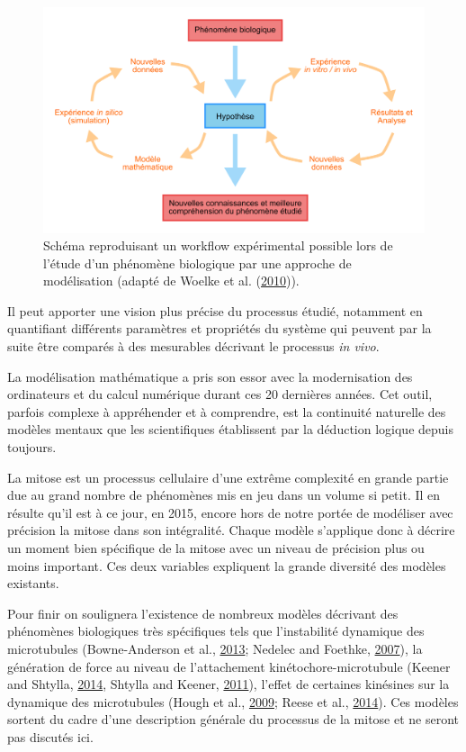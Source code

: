 \documentclass[12pt,a4paper,twoside,openright]{book}
\begin{document}
\begin{figure}[htbp]
\centering
\includegraphics{figures/intro/modelling.png}
\caption[Workflow de l'approche modélisation en biologie]{\label{fig:modelling}Schéma
reproduisant un workflow expérimental possible lors de l'étude d'un
phénomène biologique par une approche de modélisation (adapté de Woelke
et al. (\protect\hyperlink{ref-Woelke2010}{2010})).}
\end{figure}

Il peut apporter une vision plus précise du processus étudié, notamment
en quantifiant différents paramètres et propriétés du système qui
peuvent par la suite être comparés à des mesurables décrivant le
processus \emph{in vivo}.

La modélisation mathématique a pris son essor avec la modernisation des
ordinateurs et du calcul numérique durant ces 20 dernières années. Cet
outil, parfois complexe à appréhender et à comprendre, est la continuité
naturelle des modèles mentaux que les scientifiques établissent par la
déduction logique depuis toujours.

La mitose est un processus cellulaire d'une extrême complexité en grande
partie due au grand nombre de phénomènes mis en jeu dans un volume si
petit. Il en résulte qu'il est à ce jour, en 2015, encore hors de notre
portée de modéliser avec précision la mitose dans son intégralité.
Chaque modèle s'applique donc à décrire un moment bien spécifique de la
mitose avec un niveau de précision plus ou moins important. Ces deux
variables expliquent la grande diversité des modèles existants.

Pour finir on soulignera l'existence de nombreux modèles décrivant des
phénomènes biologiques très spécifiques tels que l'instabilité dynamique
des microtubules (Bowne-Anderson et al.,
\protect\hyperlink{ref-Bowne-Anderson2013}{2013}; Nedelec and Foethke,
\protect\hyperlink{ref-Nedelec2007}{2007}), la génération de force au
niveau de l'attachement kinétochore-microtubule (Keener and Shtylla,
\protect\hyperlink{ref-Keener2014}{2014}, Shtylla and Keener,
\protect\hyperlink{ref-Shtylla2011}{2011}), l'effet de certaines
kinésines sur la dynamique des microtubules (Hough et al.,
\protect\hyperlink{ref-Hough2009}{2009}; Reese et al.,
\protect\hyperlink{ref-Reese2014a}{2014}). Ces modèles sortent du cadre
d'une description générale du processus de la mitose et ne seront pas
discutés ici.
\end{document}
